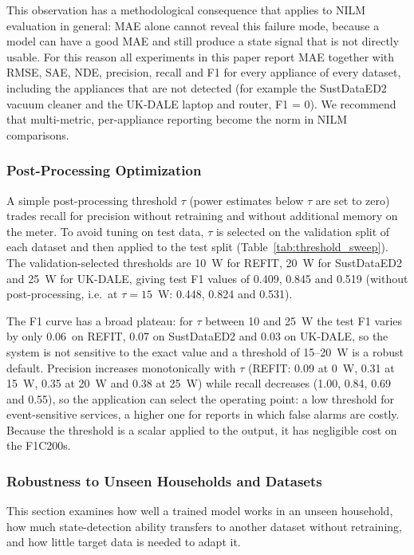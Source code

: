\documentclass[fleqn,10pt]{wlscirep}
\begin{document}
This observation has a methodological consequence that applies to NILM evaluation in general: MAE alone cannot reveal this failure mode, because a model can have a good MAE and still produce a state signal that is not directly usable. For this reason all experiments in this paper report MAE together with RMSE, SAE, NDE, precision, recall and F1 for every appliance of every dataset, including the appliances that are not detected (for example the SustDataED2 vacuum cleaner and the UK-DALE laptop and router, F1 = 0). We recommend that multi-metric, per-appliance reporting become the norm in NILM comparisons.

\subsubsection{Post-Processing Optimization}
\label{subsubsec:threshold_optimization}

A simple post-processing threshold $\tau$ (power estimates below $\tau$ are set to zero) trades recall for precision without retraining and without additional memory on the meter. To avoid tuning on test data, $\tau$ is selected on the validation split of each dataset and then applied to the test split (Table~\ref{tab:threshold_sweep}). The validation-selected thresholds are 10~W for REFIT, 20~W for SustDataED2 and 25~W for UK-DALE, giving test F1 values of 0.409, 0.845 and 0.519 (without post-processing, i.e.\ at $\tau=15$~W: 0.448, 0.824 and 0.531).


The F1 curve has a broad plateau: for $\tau$ between 10 and 25~W the test F1 varies by only 0.06~on REFIT, 0.07 on SustDataED2 and 0.03 on UK-DALE, so the system is not sensitive to the exact value and a threshold of 15--20~W is a robust default. Precision increases monotonically with $\tau$ (REFIT: 0.09 at 0~W, 0.31 at 15~W, 0.35 at 20~W and 0.38 at 25~W) while recall decreases (1.00, 0.84, 0.69 and 0.55), so the application can select the operating point: a low threshold for event-sensitive services, a higher one for reports in which false alarms are costly. Because the threshold is a scalar applied to the output, it has negligible cost on the F1C200s.

\subsubsection{Robustness to Unseen Households and Datasets}
\label{subsubsec:robustness}

This section examines how well a trained model works in an unseen household, how much state-detection ability transfers to another dataset without retraining, and how little target data is needed to adapt it.
\end{document}
